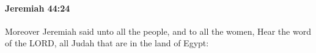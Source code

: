 
		\paragraph{Jeremiah 44:24} %
			\label{JEREMIAH-44-24}

			Moreover Jeremiah said unto all the people, and to all the women, Hear the word of the LORD, all Judah that are in the land of Egypt:


